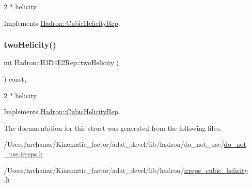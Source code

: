 2 $\ast$ helicity 

Implements \mbox{\hyperlink{structHadron_1_1CubicHelicityRep_af507aa56fc2747eacc8cb6c96db31ecc}{Hadron\+::\+Cubic\+Helicity\+Rep}}.

\mbox{\label{structHadron_1_1H3D4E2Rep_ae31f919f05b46798018cf3eb99816051}} 
\subsubsection{\texorpdfstring{twoHelicity()}{twoHelicity()}\hspace{0.1cm}{\footnotesize\ttfamily [2/2]}}
{\footnotesize\ttfamily int Hadron\+::\+H3\+D4\+E2\+Rep\+::two\+Helicity (\begin{DoxyParamCaption}{ }\end{DoxyParamCaption}) const\hspace{0.3cm}{\ttfamily [inline]}, {\ttfamily [virtual]}}

2 $\ast$ helicity 

Implements \mbox{\hyperlink{structHadron_1_1CubicHelicityRep_af507aa56fc2747eacc8cb6c96db31ecc}{Hadron\+::\+Cubic\+Helicity\+Rep}}.



The documentation for this struct was generated from the following files\+:\begin{DoxyCompactItemize}
\item 
/\+Users/archanar/\+Kinematic\+\_\+factor/adat\+\_\+devel/lib/hadron/do\+\_\+not\+\_\+use/\mbox{\hyperlink{do__not__use_8irreps_8h}{do\+\_\+not\+\_\+use.\+irreps.\+h}}\item 
/\+Users/archanar/\+Kinematic\+\_\+factor/adat\+\_\+devel/lib/hadron/\mbox{\hyperlink{lib_2hadron_2irreps__cubic__helicity_8h}{irreps\+\_\+cubic\+\_\+helicity.\+h}}\end{DoxyCompactItemize}
